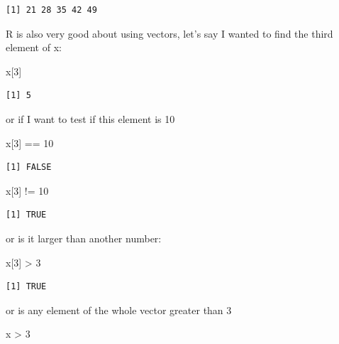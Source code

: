 \documentclass[
  letterpaper,
  DIV=11,
  numbers=noendperiod]{scrreprt}
\newenvironment{Shaded}{\begin{snugshade}}{\end{snugshade}}
\newcommand{\DecValTok}[1]{\textcolor[rgb]{0.68,0.00,0.00}{#1}}
\newcommand{\NormalTok}[1]{\textcolor[rgb]{0.00,0.23,0.31}{#1}}
\newcommand{\SpecialCharTok}[1]{\textcolor[rgb]{0.37,0.37,0.37}{#1}}
\begin{document}
\begin{verbatim}
[1] 21 28 35 42 49
\end{verbatim}

R is also very good about using vectors, let's say I wanted to find the
third element of x:

\begin{Shaded}
\begin{Highlighting}[]
\NormalTok{x[}\DecValTok{3}\NormalTok{]}
\end{Highlighting}
\end{Shaded}

\begin{verbatim}
[1] 5
\end{verbatim}

or if I want to test if this element is 10

\begin{Shaded}
\begin{Highlighting}[]
\NormalTok{x[}\DecValTok{3}\NormalTok{] }\SpecialCharTok{==} \DecValTok{10}
\end{Highlighting}
\end{Shaded}

\begin{verbatim}
[1] FALSE
\end{verbatim}

\begin{Shaded}
\begin{Highlighting}[]
\NormalTok{x[}\DecValTok{3}\NormalTok{] }\SpecialCharTok{!=} \DecValTok{10}
\end{Highlighting}
\end{Shaded}

\begin{verbatim}
[1] TRUE
\end{verbatim}

or is it larger than another number:

\begin{Shaded}
\begin{Highlighting}[]
\NormalTok{x[}\DecValTok{3}\NormalTok{] }\SpecialCharTok{\textgreater{}} \DecValTok{3}
\end{Highlighting}
\end{Shaded}

\begin{verbatim}
[1] TRUE
\end{verbatim}

or is any element of the whole vector greater than 3

\begin{Shaded}
\begin{Highlighting}[]
\NormalTok{x }\SpecialCharTok{\textgreater{}} \DecValTok{3}
\end{Highlighting}
\end{Shaded}
\end{document}
